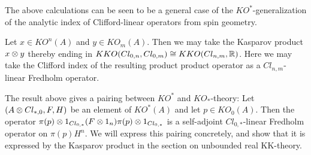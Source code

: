 The above calculations can be seen to be a general case of the $KO^{*}$-generalization of the analytic index of Clifford-linear operators from spin geometry. 
\begin{definition}
	Let $x\in KO^n(A)$ and $y\in KO_m(A)$. Then we may take the Kasparov product $x\otimes y$ thereby ending in $KKO(Cl_{0,n},Cl_{0,m})\cong KKO(Cl_{n,m},\mathbb{R})$. Here we may take the Clifford index of the resulting product product operator as a $Cl_{n,m}$-linear Fredholm operator.
\end{definition}
\begin{remark}
	The result above gives a pairing between $KO^*$ and $KO_*$-theory: Let $(A\otimes Cl_{*,0},F,H)$ be an element of $KO^*(A)$ and let $p\in KO_0(A)$. Then the operator $\pi(p)\otimes 1_{Cl_{0,*}}(F\otimes 1_n)\pi(p)\otimes 1_{Cl_{0,*}}$ is a self-adjoint $Cl_{0,*}$-linear Fredholm operator on $\pi(p) H^n$. We will express this pairing concretely, and show that it is expressed by the Kasparov product in the section on unbounded real KK-theory. 
\end{remark}